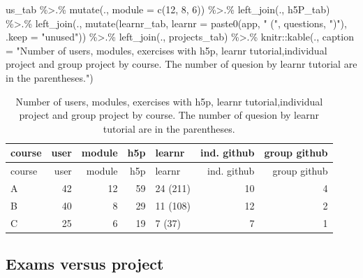 \documentclass[
]{article}
\newenvironment{Shaded}{\begin{snugshade}}{\end{snugshade}}
\newcommand{\AttributeTok}[1]{\textcolor[rgb]{0.77,0.63,0.00}{#1}}
\newcommand{\DecValTok}[1]{\textcolor[rgb]{0.00,0.00,0.81}{#1}}
\newcommand{\FunctionTok}[1]{\textcolor[rgb]{0.00,0.00,0.00}{#1}}
\newcommand{\NormalTok}[1]{#1}
\newcommand{\SpecialCharTok}[1]{\textcolor[rgb]{0.00,0.00,0.00}{#1}}
\newcommand{\StringTok}[1]{\textcolor[rgb]{0.31,0.60,0.02}{#1}}
\begin{document}
\begin{Shaded}
\begin{Highlighting}[]
\NormalTok{us\_tab }\SpecialCharTok{\%\textgreater{}.\%}
  \FunctionTok{mutate}\NormalTok{(., }\AttributeTok{module =} \FunctionTok{c}\NormalTok{(}\DecValTok{12}\NormalTok{, }\DecValTok{8}\NormalTok{, }\DecValTok{6}\NormalTok{)) }\SpecialCharTok{\%\textgreater{}.\%}
  \FunctionTok{left\_join}\NormalTok{(., h5P\_tab) }\SpecialCharTok{\%\textgreater{}.\%}
  \FunctionTok{left\_join}\NormalTok{(., }\FunctionTok{mutate}\NormalTok{(learnr\_tab, }\AttributeTok{learnr =} \FunctionTok{paste0}\NormalTok{(app, }\StringTok{" ("}\NormalTok{, questions, }\StringTok{")"}\NormalTok{), }\AttributeTok{.keep =} \StringTok{"unused"}\NormalTok{)) }\SpecialCharTok{\%\textgreater{}.\%}
  \FunctionTok{left\_join}\NormalTok{(., projects\_tab) }\SpecialCharTok{\%\textgreater{}.\%}
\NormalTok{  knitr}\SpecialCharTok{::}\FunctionTok{kable}\NormalTok{(., }\AttributeTok{caption =} \StringTok{"Number of users, modules, exercises with h5p, learnr tutorial,individual project and group project by course. The number of quesion by learnr tutorial are in the parentheses."}\NormalTok{)}
\end{Highlighting}
\end{Shaded}

\begin{longtable}[]{@{}lrrrlrr@{}}
\caption{Number of users, modules, exercises with h5p, learnr
tutorial,individual project and group project by course. The number of
quesion by learnr tutorial are in the parentheses.}\tabularnewline
\toprule
course & user & module & h5p & learnr & ind. github & group github \\
\midrule
\endfirsthead
\toprule
course & user & module & h5p & learnr & ind. github & group github \\
\midrule
\endhead
A & 42 & 12 & 59 & 24 (211) & 10 & 4 \\
B & 40 & 8 & 29 & 11 (108) & 12 & 2 \\
C & 25 & 6 & 19 & 7 (37) & 7 & 1 \\
\bottomrule
\end{longtable}

\hypertarget{exams-versus-project}{%
\subsection{Exams versus project}\label{exams-versus-project}}
\end{document}

